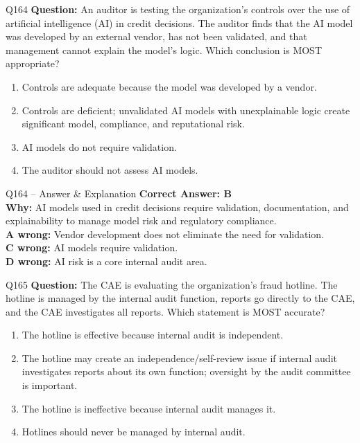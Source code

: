 \documentclass[aspectratio=169,10pt]{beamer}
\begin{document}
	\begin{frame}[t]{Q164}
		\small
		\textbf{Question:} An auditor is testing the organization's controls over the use of artificial intelligence (AI) in credit decisions. The auditor finds that the AI model was developed by an external vendor, has not been validated, and that management cannot explain the model's logic. Which conclusion is MOST appropriate?
		\begin{enumerate}[label=\Alph*.,itemsep=1pt,topsep=2pt]
			\item Controls are adequate because the model was developed by a vendor.
			\item Controls are deficient; unvalidated AI models with unexplainable logic create significant model, compliance, and reputational risk.
			\item AI models do not require validation.
			\item The auditor should not assess AI models.
		\end{enumerate}
	\end{frame}
	
	\begin{frame}[t]{Q164 -- Answer \& Explanation}
		\small
		\textbf{Correct Answer: B} \\[4pt]
		\textbf{Why:} AI models used in credit decisions require validation, documentation, and explainability to manage model risk and regulatory compliance. \\[4pt]
		\textbf{A wrong:} Vendor development does not eliminate the need for validation. \\[2pt]
		\textbf{C wrong:} AI models require validation. \\[2pt]
		\textbf{D wrong:} AI risk is a core internal audit area.
	\end{frame}
	
	\begin{frame}[t]{Q165}
		\small
		\textbf{Question:} The CAE is evaluating the organization's fraud hotline. The hotline is managed by the internal audit function, reports go directly to the CAE, and the CAE investigates all reports. Which statement is MOST accurate?
		\begin{enumerate}[label=\Alph*.,itemsep=1pt,topsep=2pt]
			\item The hotline is effective because internal audit is independent.
			\item The hotline may create an independence/self-review issue if internal audit investigates reports about its own function; oversight by the audit committee is important.
			\item The hotline is ineffective because internal audit manages it.
			\item Hotlines should never be managed by internal audit.
		\end{enumerate}
	\end{frame}
	
\end{document}
